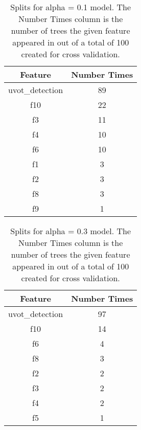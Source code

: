\begin{table}[H]
\begin{center}
\begin{tabular}{cc}
  \hline
Feature & Number Times \\ 
  \hline
uvot\_detection & 89 \\ 
  f10 & 22 \\ 
  f3 & 11 \\ 
  f4 & 10 \\ 
  f6 & 10 \\ 
  f1 & 3 \\ 
  f2 & 3 \\ 
  f8 & 3 \\ 
  f9 & 1 \\ 
   \hline
\end{tabular}
\caption{Splits for alpha = 0.1 model. The Number Times column is the number of trees the given feature appeared in out of a total of 100 created for cross validation.}
\end{center}
\end{table}
\begin{table}[H]
\begin{center}
\begin{tabular}{cc}
  \hline
Feature & Number Times \\ 
  \hline
uvot\_detection & 97 \\ 
  f10 & 14 \\ 
  f6 & 4 \\ 
  f8 & 3 \\ 
  f2 & 2 \\ 
  f3 & 2 \\ 
  f4 & 2 \\ 
  f5 & 1 \\ 
   \hline
\end{tabular}
\caption{Splits for alpha = 0.3 model. The Number Times column is the number of trees the given feature appeared in out of a total of 100 created for cross validation.}
\end{center}
\end{table}
